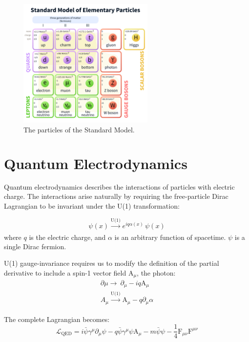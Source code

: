 \begin{figure}[htbp]
\centering
\includegraphics[width=0.6\textwidth]{figs/StandardModelofElementaryParticles.pdf}
\caption{The particles of the Standard Model.}
\label{fig:sm}
\end{figure}

\section{Quantum Electrodynamics}

Quantum electrodynamics describes the interactions of particles with electric charge. The interactions arise naturally by requiring the free-particle Dirac Lagrangian to be invariant under the U(1) transformation:

\begin{equation}
\psi(x)  \xrightarrow[]{\text{U(1)}} e^{i q \alpha(x)}\,\psi(x)
\label{eq:u1}
\end{equation}
where $q$ is the electric charge, and $\alpha$ is an arbitrary function of spacetime. $\psi$ is a single Dirac fermion.

U(1) gauge-invariance requires us to modify the definition of the partial derivative to include a spin-1 vector field $\mathrm{A}_{\mu}$, the photon:
\begin{equation}
\begin{array}{l}
\partial{\mu} \rightarrow\ \partial_{\mu} - iq\mathrm{A}_{\mu}
\\A_{\mu} \xrightarrow[]{\text{U(1)}} \mathrm{A}_{\mu} - q \partial_{\mu} \alpha
 \end{array}
\end{equation}

The complete Lagrangian becomes:
\begin{equation}
\mathcal{L}_{\mathrm{QED}} =
i\bar{\psi}\gamma^{\mu}\partial_{\mu}\psi
- q\bar{\psi}\gamma^{\mu}\psi \mathrm{A}_{\mu}
- m\bar{\psi}\psi
- \frac{1}{4}\mathrm{F}_{\mu\nu} \mathrm{F}^{\mu\nu}
\end{equation}

